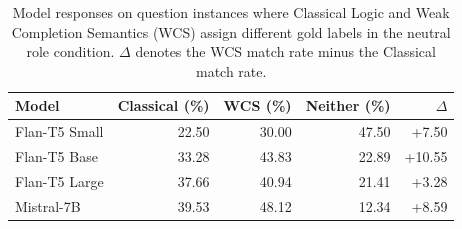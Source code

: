 \begin{table}[htbp]
\caption{Model responses on question instances where Classical Logic and Weak Completion Semantics (WCS) assign different gold labels in the neutral role condition. $\Delta$ denotes the WCS match rate minus the Classical match rate.}
\label{tab:disagreement-neutral}
\begin{tabular}{lrrrr}
\toprule
Model & Classical (\%) & WCS (\%) & Neither (\%) & $\Delta$ \\
\midrule
Flan-T5 Small & 22.50 & 30.00 & 47.50 & +7.50 \\
Flan-T5 Base & 33.28 & 43.83 & 22.89 & +10.55 \\
Flan-T5 Large & 37.66 & 40.94 & 21.41 & +3.28 \\
Mistral-7B & 39.53 & 48.12 & 12.34 & +8.59 \\
\bottomrule
\end{tabular}
\end{table}
